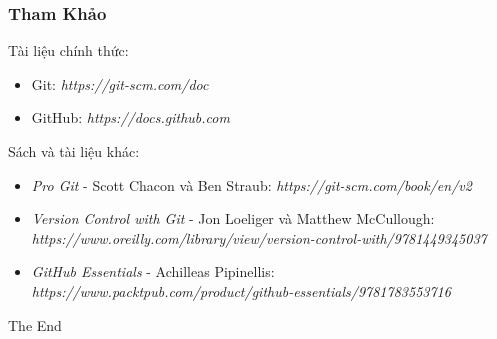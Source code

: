 \documentclass{beamer}
\begin{document}
\begin{frame}
\frametitle{Tham Khảo}

\item Tài liệu chính thức:
\begin{itemize}
\item Git: \textit{https://git-scm.com/doc}
\item GitHub: \textit{https://docs.github.com}
\end{itemize}


\item Sách và tài liệu khác:
\begin{itemize}
\item \textit{Pro Git} - Scott Chacon và Ben Straub: \textit{https://git-scm.com/book/en/v2}
\item \textit{Version Control with Git} - Jon Loeliger và Matthew McCullough: \textit{https://www.oreilly.com/library/view/version-control-with/9781449345037}
\item \textit{GitHub Essentials} - Achilleas Pipinellis: \textit{https://www.packtpub.com/product/github-essentials/9781783553716}
\end{itemize}


\end{frame}

\begin{frame}
\Huge{\centerline{The End}}
\end{frame}

\end{document}
